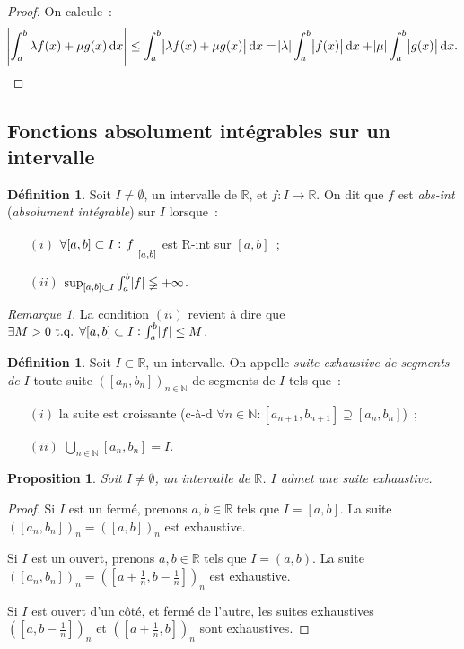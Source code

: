 \documentclass{report}
\newtheorem{prp}[thm]{Proposition}
\theoremstyle{definition}
\newtheorem{déf}[thm]{Définition}
\theoremstyle{remark}
\newtheorem*{rmq}{Remarque}
\numberwithin{equation}{section}
\newcommand{\R}{\mathbb R}
\newcommand{\N}{\mathbb N}
\newcommand{\tq}{\text{ t.q. }}
\newcommand{\restr}[2]{\left.#1\vphantom{\big|}\right|_{#2}}
\newcommand{\pinfty}{{+\infty}}
\begin{document}
			\begin{proof} On calcule~:
			\begin{equation}
				\abs {\int_a^b \lambda f(x) + \mu g(x)\dif x} \leq \int_a^b\abs {\lambda f(x) + \mu g(x)}\dif x
				= \abs \lambda\int_a^b\abs {f(x)}\dif x + \abs \mu\int_a^b\abs {g(x)}\dif x.
			\end{equation}
			\end{proof}

		\subsection{Fonctions absolument intégrables sur un intervalle}
			\begin{déf} Soit $I \neq \emptyset$, un intervalle de $\R$, et $f : I \to \R$. On dit que $f$ est \textit{abs-int} (\textit{absolument intégrable})
			sur $I$ lorsque~:
			\begin{itemize}
				\item[$(i)$] $\forall [a, b] \subset I : \restr f{[a, b]}$ est R-int sur $[a, b]$~;
				\item[$(ii)$] $\sup_{[a, b] \subset I} \int_a^b \abs f \lneqq \pinfty$.
			\end{itemize}
			\end{déf}

			\begin{rmq} La condition $(ii)$ revient à dire que $\exists M > 0 \tq \forall [a, b] \subset I : \int_a^b \abs f \leq M$.
			\end{rmq}

			\begin{déf} Soit $I \subset \R$, un intervalle. On appelle \textit{suite exhaustive de segments de $I$} toute suite $([a_n, b_n])_{n \in \N}$ de
			segments de $I$ tels que~:
			\begin{itemize}
				\item[$(i)$]  la suite est croissante (c-à-d $\forall n \in \N : [a_{n+1}, b_{n+1}] \supseteq [a_n, b_n]$)~;
				\item[$(ii)$] $\bigcup_{n \in \N}[a_n, b_n] = I$.
			\end{itemize}
			\end{déf}

			\begin{prp} Soit $I \neq \emptyset$, un intervalle de $\R$. $I$ admet une suite exhaustive.
			\end{prp}

			\begin{proof} Si $I$ est un fermé, prenons $a, b \in \R$ tels que $I = [a, b]$. La suite $([a_n, b_n])_n = ([a, b])_n$ est exhaustive.

			Si $I$ est un ouvert, prenons $a, b \in \R$ tels que $I = (a, b)$. La suite $([a_n, b_n])_n = ([a + \frac 1n, b - \frac 1n])_n$ est exhaustive.

			Si $I$ est ouvert d'un côté, et fermé de l'autre, les suites exhaustives $([a, b-\frac 1n])_n$ et $([a + \frac 1n, b])_n$ sont exhaustives.
			\end{proof}
\end{document}
